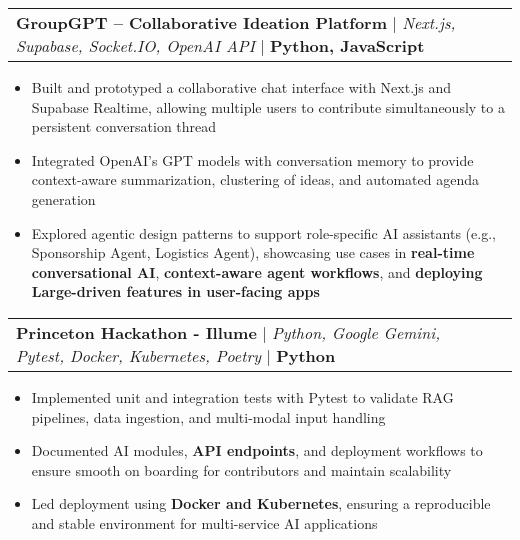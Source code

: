 \documentclass[letterpaper,10pt]{article}
\makeatletter
\newcommand{\resumeItem}[1]{
  \item\small{
    {#1 \vspace{-3pt}}
  }
}
\newcommand{\resumeProjectHeading}[2]{
    \item
    \begin{tabular*}{0.97\textwidth}{l@{\extracolsep{\fill}}r}
      \small#1 & #2 \\
    \end{tabular*}\vspace{-9pt}
}
\newcommand{\resumeItemListStart}{\begin{itemize}}
\newcommand{\resumeItemListEnd}{\end{itemize}\vspace{-7pt}}
\makeatother
\begin{document}
    \vspace{20pt}
    
    \resumeProjectHeading
    {\textbf{GroupGPT – Collaborative Ideation Platform} $|$ \emph{Next.js, Supabase, Socket.IO, OpenAI API} $|$ \textbf{Python, JavaScript}}{}
  \resumeItemListStart  
  \vspace{5pt}
    \resumeItem{Built and prototyped a collaborative chat interface with Next.js and Supabase Realtime, allowing multiple users to contribute simultaneously to a persistent conversation thread}
    \vspace{5pt}
    \resumeItem{Integrated OpenAI’s GPT models with conversation memory to provide context-aware summarization, clustering of ideas, and automated agenda generation}
    \vspace{5pt}
    \resumeItem{Explored agentic design patterns to support role-specific AI assistants (e.g., Sponsorship Agent, Logistics Agent), showcasing use cases in \textbf{real-time conversational AI}, \textbf{context-aware agent workflows}, and \textbf{deploying Large-driven features in user-facing apps}}
  \resumeItemListEnd

  \vspace{20pt}
    
        \resumeProjectHeading
        {\textbf{Princeton Hackathon - Illume} $|$ \emph{Python, Google Gemini, Pytest, Docker, Kubernetes, Poetry } $|$ \textbf{Python}}{}
          \resumeItemListStart
          \vspace{5pt}
           \resumeItem{Implemented unit and integration tests with Pytest to validate RAG pipelines, data ingestion, and multi-modal input handling}
           \vspace{5pt}
           \resumeItem{Documented AI modules, \textbf{API endpoints}, and deployment workflows to ensure smooth on boarding for contributors and maintain scalability}
           \vspace{5pt}
           \resumeItem{Led deployment using \textbf{Docker and Kubernetes}, ensuring a reproducible and stable environment for multi-service AI applications}
          \resumeItemListEnd
\end{document}
